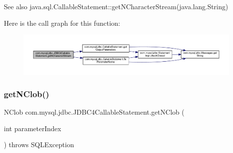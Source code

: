 \begin{DoxySeeAlso}{See also}
java.\+sql.\+Callable\+Statement\+::get\+N\+Character\+Stream(java.\+lang.\+String) 
\end{DoxySeeAlso}
Here is the call graph for this function\+:
\nopagebreak
\begin{figure}[H]
\begin{center}
\leavevmode
\includegraphics[width=350pt]{classcom_1_1mysql_1_1jdbc_1_1_j_d_b_c4_callable_statement_ab33ce6e6788ccee8df3cc52bb4e043ec_cgraph}
\end{center}
\end{figure}
\mbox{\label{classcom_1_1mysql_1_1jdbc_1_1_j_d_b_c4_callable_statement_a0c1a156017f1eb908fcfca7c724edacb}} 
\subsubsection{\texorpdfstring{get\+N\+Clob()}{getNClob()}\hspace{0.1cm}{\footnotesize\ttfamily [1/2]}}
{\footnotesize\ttfamily N\+Clob com.\+mysql.\+jdbc.\+J\+D\+B\+C4\+Callable\+Statement.\+get\+N\+Clob (\begin{DoxyParamCaption}\item[{int}]{parameter\+Index }\end{DoxyParamCaption}) throws S\+Q\+L\+Exception}

